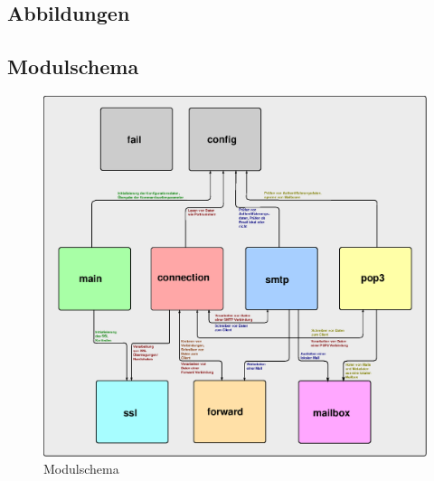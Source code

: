 \documentclass[final,a4paper,11pt,notitlepage,halfparskip]{scrreprt}
\begin{document}
\pagebreak

\begin{appendix}
  \chapter{Abbildungen}
  \section{Modulschema}
  \begin{figure}[htb]
    \includegraphics[width=\textwidth]{schema.eps}
    \caption{Modulschema}
    \label{fig:schema}
  \end{figure}
\end{appendix}
\end{document}
